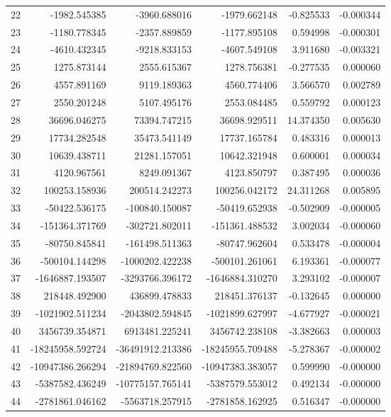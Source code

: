 \begin{tabular}{lrrrrr}
22 & -1982.545385 & -3960.688016 & -1979.662148 & -0.825533 & -0.000344 \\
23 & -1180.778345 & -2357.889859 & -1177.895108 & 0.594998 & -0.000301 \\
24 & -4610.432345 & -9218.833153 & -4607.549108 & 3.911680 & -0.003321 \\
25 & 1275.873144 & 2555.615367 & 1278.756381 & -0.277535 & 0.000060 \\
26 & 4557.891169 & 9119.189363 & 4560.774406 & 3.566570 & 0.002789 \\
27 & 2550.201248 & 5107.495176 & 2553.084485 & 0.559792 & 0.000123 \\
28 & 36696.046275 & 73394.747215 & 36698.929511 & 14.374350 & 0.005630 \\
29 & 17734.282548 & 35473.541149 & 17737.165784 & 0.483316 & 0.000013 \\
30 & 10639.438711 & 21281.157051 & 10642.321948 & 0.600001 & 0.000034 \\
31 & 4120.967561 & 8249.091367 & 4123.850797 & 0.387495 & 0.000036 \\
32 & 100253.158936 & 200514.242273 & 100256.042172 & 24.311268 & 0.005895 \\
33 & -50422.536175 & -100840.150087 & -50419.652938 & -0.502909 & -0.000005 \\
34 & -151364.371769 & -302721.802011 & -151361.488532 & 3.002034 & -0.000060 \\
35 & -80750.845841 & -161498.511363 & -80747.962604 & 0.533478 & -0.000004 \\
36 & -500104.144298 & -1000202.422238 & -500101.261061 & 6.193361 & -0.000077 \\
37 & -1646887.193507 & -3293766.396172 & -1646884.310270 & 3.293102 & -0.000007 \\
38 & 218448.492900 & 436899.478833 & 218451.376137 & -0.132645 & 0.000000 \\
39 & -1021902.511234 & -2043802.594845 & -1021899.627997 & -4.677927 & -0.000021 \\
40 & 3456739.354871 & 6913481.225241 & 3456742.238108 & -3.382663 & 0.000003 \\
41 & -18245958.592724 & -36491912.213386 & -18245955.709488 & -5.278367 & -0.000002 \\
42 & -10947386.266294 & -21894769.822560 & -10947383.383057 & 0.599990 & -0.000000 \\
43 & -5387582.436249 & -10775157.765141 & -5387579.553012 & 0.492134 & -0.000000 \\
44 & -2781861.046162 & -5563718.257915 & -2781858.162925 & 0.516347 & -0.000000 \\

\end{tabular}
